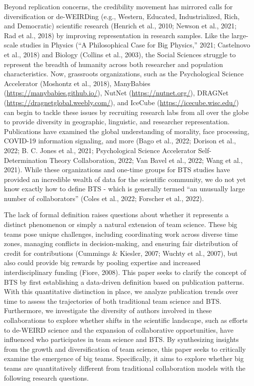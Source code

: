 \documentclass[
  man,floatsintext]{apa7}
\begin{document}
Beyond replication concerns, the credibility movement has mirrored calls
for diversification or de-WEIRDing (e.g., Western, Educated,
Industrialized, Rich, and Democratic) scientific research (Henrich et al., 2010; Newson et al., 2021; Rad et al., 2018) by improving representation in research samples.
Like the large-scale studies in Physics ({``A Philosophical Case for Big Physics,''} 2021; Castelnovo et al., 2018)
and Biology (Collins et al., 2003), the Social Sciences struggle to represent
the breadth of humanity across both researcher and population
characteristics. Now, grassroots organizations, such as the
Psychological Science Accelerator (Moshontz et al., 2018), ManyBabies
(\url{https://manybabies.github.io/}), NutNet (\url{https://nutnet.org/}),
DRAGNet (\url{https://dragnetglobal.weebly.com/}), and IceCube
(\url{https://icecube.wisc.edu/}) can begin to tackle these issues by
recruiting research labs from all over the globe to provide diversity in
geographic, linguistic, and researcher representation. Publications have
examined the global understanding of morality, face processing, COVID-19
information signaling, and more (Bago et al., 2022; Dorison et al., 2022; B. C. Jones et al., 2021; Psychological Science Accelerator Self-Determination Theory Collaboration, 2022; Van Bavel et al., 2022; Wang et al., 2021). While these organizations and one-time groups
for BTS studies have provided an incredible wealth of data for the
scientific community, we do not yet know exactly how to define BTS -
which is generally termed ``an unusually large number of collaborators''
(Coles et al., 2022; Forscher et al., 2022).

The lack of formal definition raises questions about whether it
represents a distinct phenomenon or simply a natural extension of team
science. These big teams pose unique challenges, including coordinating
work across diverse time zones, managing conflicts in decision-making,
and ensuring fair distribution of credit for contributions
(Cummings \& Kiesler, 2007; Wuchty et al., 2007), but also could provide big rewards by
pooling expertise and increased interdisciplinary funding (Fiore, 2008).
This paper seeks to clarify the concept of BTS by first establishing a
data-driven definition based on publication patterns. With this
quantitative distinction in place, we analyze publication trends over
time to assess the trajectories of both traditional team science and
BTS. Furthermore, we investigate the diversity of authors involved in
these collaborations to explore whether shifts in the scientific
landscape, such as efforts to de-WEIRD science and the expansion of
collaborative opportunities, have influenced who participates in team
science and BTS. By synthesizing insights from the growth and
diversification of team science, this paper seeks to critically examine
the emergence of big teams. Specifically, it aims to explore whether big
teams are quantitatively different from traditional collaboration models
with the following research questions.
\end{document}

